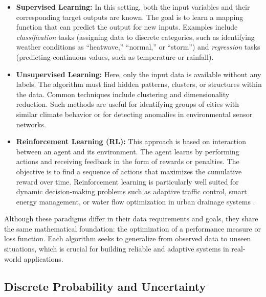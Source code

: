 \documentclass[12pt]{article}
\begin{document}
\begin{itemize}
    \item \textbf{Supervised Learning:}  
    In this setting, both the input variables and their corresponding target outputs are known.  
    The goal is to learn a mapping function that can predict the output for new inputs.  
    Examples include \textit{classification} tasks (assigning data to discrete categories, such as identifying weather conditions as ``heatwave,'' ``normal,'' or ``storm'') and \textit{regression} tasks (predicting continuous values, such as temperature or rainfall).

    \item \textbf{Unsupervised Learning:}  
    Here, only the input data is available without any labels.  
    The algorithm must find hidden patterns, clusters, or structures within the data.  
    Common techniques include clustering and dimensionality reduction.  
    Such methods are useful for identifying groups of cities with similar climate behavior or for detecting anomalies in environmental sensor networks.

    \item \textbf{Reinforcement Learning (RL):}  
    This approach is based on interaction between an agent and its environment.  
    The agent learns by performing actions and receiving feedback in the form of rewards or penalties.  
    The objective is to find a sequence of actions that maximizes the cumulative reward over time.  
    Reinforcement learning is particularly well suited for dynamic decision-making problems such as adaptive traffic control, smart energy management, or water flow optimization in urban drainage systems \cite{sutton1998reinforcement}.
\end{itemize}

Although these paradigms differ in their data requirements and goals, they share the same mathematical foundation: the optimization of a performance measure or loss function. 
Each algorithm seeks to generalize from observed data to unseen situations, which is crucial for building reliable and adaptive systems in real-world applications.

\subsection{Discrete Probability and Uncertainty}
\end{document}
